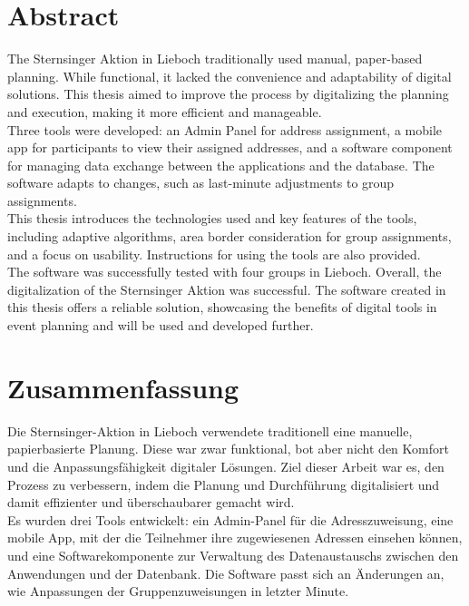 
\noindent
\setlength{\parindent}{0pt}
\begin{spacing}{1.5}


\section*{Abstract}
The Sternsinger Aktion in Lieboch traditionally used manual, paper-based planning. While functional, it lacked the convenience and adaptability of digital solutions. This thesis aimed to improve the process by digitalizing the planning and execution, making it more efficient and manageable.\\

Three tools were developed: an Admin Panel for address assignment, a mobile app for participants to view their assigned addresses, and a software component for managing data exchange between the applications and the database. The software adapts to changes, such as last-minute adjustments to group assignments.\\

This thesis introduces the technologies used and key features of the tools, including adaptive algorithms, area border consideration for group assignments, and a focus on usability. Instructions for using the tools are also provided.\\

The software was successfully tested with four groups in Lieboch. Overall, the digitalization of the Sternsinger Aktion was successful. The software created in this thesis offers a reliable solution, showcasing the benefits of digital tools in event planning and will be used and developed further.\\

\newpage

\section*{Zusammenfassung}
Die Sternsinger-Aktion in Lieboch verwendete traditionell eine manuelle, papierbasierte Planung. Diese war zwar funktional, bot aber nicht den Komfort und die Anpassungsfähigkeit digitaler Lösungen. Ziel dieser Arbeit war es, den Prozess zu verbessern, indem die Planung und Durchführung digitalisiert und damit effizienter und überschaubarer gemacht wird.\\

Es wurden drei Tools entwickelt: ein Admin-Panel für die Adresszuweisung, eine mobile App, mit der die Teilnehmer ihre zugewiesenen Adressen einsehen können, und eine Softwarekomponente zur Verwaltung des Datenaustauschs zwischen den Anwendungen und der Datenbank. Die Software passt sich an Änderungen an, wie Anpassungen der Gruppenzuweisungen in letzter Minute.\\


\end{spacing}
